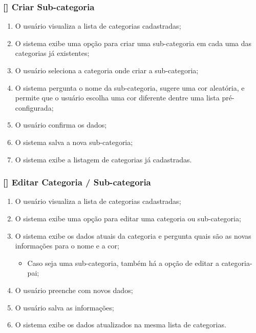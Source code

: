 \documentclass[a4paper]{abnt}
\begin{document}
\subsubsection{[\UC] Criar Sub-categoria}
\begin{enumerate}[itemsep=-1ex]
	\item O usuário visualiza a lista de categorias cadastradas;
	\item O sistema exibe uma opção para criar uma sub-categoria em cada uma das categorias já existentes;
	\item O usuário seleciona a categoria onde criar a sub-categoria;
	\item O sistema pergunta o nome da sub-categoria, sugere uma cor aleatória, e permite que o usuário escolha uma cor diferente dentre uma lista pré-configurada;
	\item O usuário confirma os dados;
	\item O sistema salva a nova sub-categoria;
	\item O sistema exibe a listagem de categorias já cadastradas.
\end{enumerate}

\subsubsection{[\UC] Editar Categoria / Sub-categoria}
\begin{enumerate}[itemsep=-1ex]
	\item O usuário visualiza a lista de categorias cadastradas;
	\item O sistema exibe uma opção para editar uma categoria ou sub-categoria;
	\item O sistema exibe os dados atuais da categoria e pergunta quais são as novas informações para o nome e a cor;
	\begin{itemize}[itemsep=-1ex,topsep=-1ex]
		\item Caso seja uma sub-categoria, também há a opç\~ao de editar a categoria-pai;
	\end{itemize}
	\item O usuário preenche com novos dados;
	\item O usuário salva as informaç\~oes;
	\item O sistema exibe os dados atualizados na mesma lista de categorias.
\end{enumerate}
\end{document}
